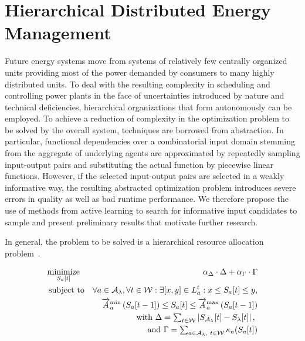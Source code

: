 \documentclass[conference]{IEEEtran}
\begin{document}
\section{Hierarchical Distributed Energy Management}
Future energy systems move from systems of relatively few centrally organized units
providing most of the power demanded by consumers to many highly distributed units.
To deal with the resulting complexity in scheduling and controlling power plants in the face of 
uncertainties introduced by nature and technical deficiencies, hierarchical organizations 
that form autonomously can be employed. To achieve a reduction of complexity in the optimization 
problem to be solved by the overall system, techniques are borrowed from abstraction. 
In particular, functional dependencies over a combinatorial input domain stemming from the
aggregate of underlying agents are approximated by repeatedly sampling input-output pairs
and substituting the actual function by piecewise linear functions. However, if
the selected input-output pairs are selected in a weakly informative way, the resulting abstracted
optimization problem introduces severe errors in quality as well as bad runtime performance.
We therefore propose the use of methods from active learning to search for informative
input candidates to sample and present preliminary results that motivate further research. 

In general, the problem to be solved is a hierarchical resource allocation problem~\cite{VanZandt1995}.

\begin{eqnarray}
\label{eq:csop-scheduling-hierarchy} \textstyle
		& \underset{\AgentPower{t}{\AnAgent}}{\operatorname{minimize}} & 
		\alpha_{\ViolationObjective} \cdot \ViolationObjective + \alpha_{\CostsObjective} \cdot \CostsObjective \\
		& \operatorname{subject\ to} & \forall a \in \Subsystem, \forall t \in \Horizon : \exists [x , y] \in \ListProduction{t}\AnAgent : x \leq \AgentPower{t}{\AnAgent} \leq y\text{,} \nonumber \\
		& & \ChangeSpeedMin\AnAgent \left(\AgentPower{t-1}\AnAgent\right) \leq \AgentPower{t}{\AnAgent} \leq \ChangeSpeedMax\AnAgent\left(\AgentPower{t-1}\AnAgent\right) \nonumber\\
		& & \textstyle \text{with } \ViolationObjective = \sum_{t \in \Horizon} \left|\Production_\Subsystem[t] - \AssResidualLoad{t}{\AnAvpp} \right| \text{, } \nonumber \\
		& & \textstyle \text{and } 
		\CostsObjective = \sum_{a \in \Subsystem,\ t \in \Horizon} \CostFunction\AnAgent{\AgentPower{t}{\AnAgent}} \nonumber
\end{eqnarray}
\end{document}
